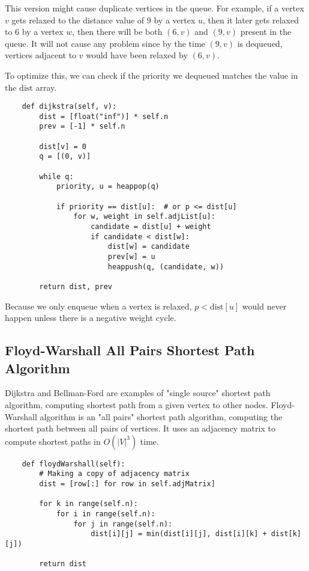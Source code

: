 \noindent This version might cause duplicate vertices in the queue.
For example, if a vertex $v$ gets relaxed to the distance value of $9$ by a vertex $u$, then it later gets relaxed to $6$ by a vertex $w$, then there will be both $(6, v)$ and $(9, v)$ present in the queue.
It will not cause any problem since by the time $(9, v)$ is dequeued, vertices adjacent to $v$ would have been relaxed by $(6, v)$.

\noindent To optimize this, we can check if the priority we dequeued matches the value in the $\textrm{dist}$ array.

\begin{verbatim}
    def dijkstra(self, v):
        dist = [float("inf")] * self.n
        prev = [-1] * self.n

        dist[v] = 0
        q = [(0, v)]

        while q:
            priority, u = heappop(q)

            if priority == dist[u]:  # or p <= dist[u]
                for w, weight in self.adjList[u]:
                    candidate = dist[u] + weight
                    if candidate < dist[w]:
                        dist[w] = candidate
                        prev[w] = u
                        heappush(q, (candidate, w))

        return dist, prev
\end{verbatim}

\noindent Because we only enqueue when a vertex is relaxed, $p < \textrm{dist}[u]$ would never happen unless there is a negative weight cycle.

\subsection{Floyd-Warshall All Pairs Shortest Path Algorithm}

Dijkstra and Bellman-Ford are examples of "single source" shortest path algorithm, computing shortest path from a given vertex to other nodes.
Floyd-Warshall algorithm is an "all pairs" shortest path algorithm, computing the shortest path between all pairs of vertices.
It uses an adjacency matrix to compute shortest paths in $O(|V|^3)$ time.

\begin{verbatim}
    def floydWarshall(self):
        # Making a copy of adjacency matrix
        dist = [row[:] for row in self.adjMatrix]

        for k in range(self.n):
            for i in range(self.n):
                for j in range(self.n):
                    dist[i][j] = min(dist[i][j], dist[i][k] + dist[k][j])

        return dist
\end{verbatim}

